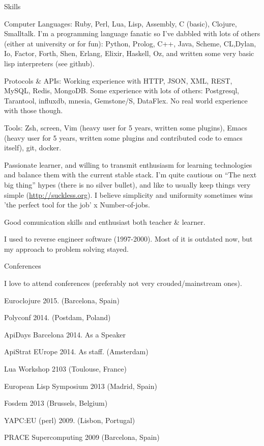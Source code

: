 \documentclass{resume} %
\begin{document}

\begin{rSection}{Skills}

\item Computer Languages: Ruby, Perl, Lua, Lisp, Assembly, C (basic),
  Clojure, Smalltalk.  I'm a programming language fanatic so I've
  dabbled with lots of others (either at university or for fun):
  Python, Prolog, C++, Java, Scheme, CL,Dylan, Io, Factor, Forth,
  Shen, Erlang, Elixir, Haskell, Oz, and written some very basic lisp
  interpreters (see github).

\item Protocols \& APIs: Working experience with HTTP, JSON, XML,
  REST, MySQL, Redis, MongoDB. Some experience with lots of others:
  Postgresql, Tarantool, influxdb, mnesia, Gemstone/S, DataFlex.  No
  real world experience with those though.
\item Tools: Zsh, screen, Vim (heavy user for 5 years, written some
  plugins), Emacs (heavy user for 5 years, written some plugins and
  contributed code to  emacs itself), git, docker.

\item Passionate learner, and willing to transmit enthusiasm for
  learning technologies and balance them with the current stable
  stack. I'm quite cautious on ``The next big thing'' hypes (there is
  no silver bullet), and like to usually keep things very simple
  (\url{http://suckless.org}). I believe simplicity and uniformity
  sometimes wins 'the perfect tool for the job' x Number-of-jobs.
\item Good comunication skills and enthusiast both teacher \& learner.
\item I used to reverse engineer software (1997-2000). Most of it is
  outdated now, but my approach to problem solving stayed.

\end{rSection}

\begin{rSection}{Conferences}

  I love to attend conferences (preferably not very crouded/mainstream ones).

\item Euroclojure 2015. (Barcelona, Spain)
\item Polyconf 2014. (Postdam, Poland)
\item ApiDays Barcelona 2014. As a Speaker
\item ApiStrat EUrope 2014. As staff. (Amsterdam)
\item Lua Workshop 2103 (Toulouse, France)
\item European Lisp Symposium 2013 (Madrid, Spain)
\item Fosdem 2013 (Brussels, Belgium)
\item YAPC:EU (perl) 2009. (Lisbon, Portugal)
\item PRACE Supercomputing 2009 (Barcelona, Spain)

\end{rSection}
\end{document}
